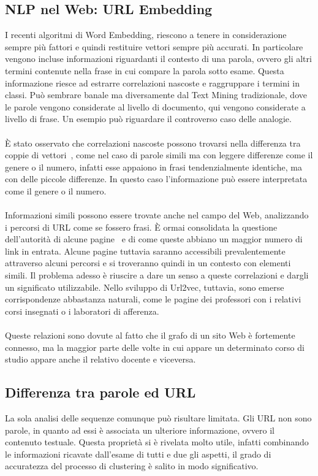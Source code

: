 \subsection{NLP nel Web: URL Embedding}
I recenti algoritmi di Word Embedding, riescono a tenere in considerazione sempre più fattori e quindi restituire vettori sempre più accurati. In particolare vengono incluse informazioni riguardanti il contesto di una parola, ovvero gli altri termini contenute nella frase in cui compare la parola sotto esame. Questa informazione riesce ad estrarre correlazioni nascoste e raggruppare i termini in classi. Può sembrare banale ma diversamente dal Text Mining tradizionale, dove le parole vengono considerate al livello di documento, qui vengono considerate a livello di frase. Un esempio può riguardare il controverso caso delle analogie. 
\\\\
È stato osservato che correlazioni nascoste possono trovarsi nella differenza tra coppie di vettori~\cite{Mikolov13}, come nel caso di parole simili ma con leggere differenze come il genere o il numero, infatti esse appaiono in frasi tendenzialmente identiche, ma con delle piccole differenze. In questo caso l'informazione può essere interpretata come il genere o il numero.
\\\\
Informazioni simili possono essere trovate anche nel campo del Web, analizzando i percorsi di URL come se fossero frasi. È ormai consolidata la questione dell'autorità di alcune pagine~\cite{Kleinberg99}
e di come queste abbiano un maggior numero di link in entrata. Alcune pagine tuttavia saranno accessibili prevalentemente attraverso alcuni percorsi e si troveranno quindi in un contesto con elementi simili. Il problema adesso è riuscire a dare un senso a queste correlazioni e dargli un significato utilizzabile. Nello sviluppo di Url2vec, tuttavia, sono emerse corrispondenze abbastanza naturali, come le pagine dei professori con i relativi corsi insegnati o i laboratori di afferenza. 
\\\\
Queste relazioni sono dovute al fatto che il grafo di un sito Web è fortemente connesso, ma la maggior parte delle volte in cui appare un determinato corso di studio appare anche il relativo docente e viceversa. 

\subsection{Differenza tra parole ed URL}
La sola analisi delle sequenze comunque può risultare limitata. Gli URL non sono parole, in quanto ad essi è associata un ulteriore informazione, ovvero il contenuto testuale. Questa proprietà si è rivelata molto utile, infatti combinando le informazioni ricavate dall'esame di tutti e due gli aspetti, il grado di accuratezza del processo di clustering è salito in modo significativo. 

